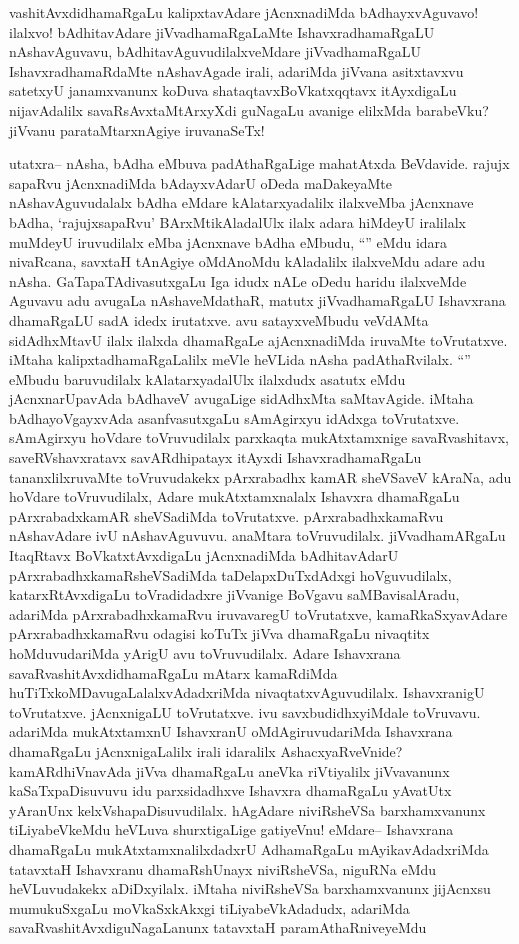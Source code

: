 
\begin{artha}
vashitAvxdidhamaRgaLu kalipxtavAdare jAcnxnadiMda bAdhayxvAguvavo! ilalxvo! bAdhitavAdare jiVvadhamaRgaLaMte IshavxradhamaRgaLU nAshavAguvavu, bAdhitavAguvudilalxveMdare jiVvadhamaRgaLU IshavxradhamaRdaMte nAshavAgade irali, adariMda jiVvana asitxtavxvu satetxyU janamxvanunx koDuva shataqtavxBoVkatxqqtavx itAyxdigaLu nijavAdalilx savaRsAvxtaMtArxyXdi guNagaLu avanige elilxMda barabeVku? jiVvanu parataMtarxnAgiye iruvanaSeTx!
\end{artha}

\begin{artha}
utatxra-- nAsha, bAdha eMbuva padAthaRgaLige mahatAtxda BeVdavide. rajujx sapaRvu jAcnxnadiMda bAdayxvAdarU oDeda maDakeyaMte nAshavAguvudalalx bAdha eMdare kAlatarxyadalilx ilalxveMba jAcnxnave bAdha, `rajujxsapaRvu' BArxMtikAladalUlx ilalx adara hiMdeyU iralilalx muMdeyU iruvudilalx eMba jAcnxnave bAdha eMbudu, ``\stext'' eMdu idara nivaRcana, savxtaH tAnAgiye oMdAnoMdu kAladalilx ilalxveMdu adare adu nAsha. GaTapaTAdivasutxgaLu Iga idudx nALe oDedu haridu ilalxveMde Aguvavu adu avugaLa nAshaveMdathaR, matutx jiVvadhamaRgaLU Ishavxrana dhamaRgaLU sadA idedx irutatxve. avu satayxveMbudu veVdAMta sidAdhxMtavU ilalx ilalxda dhamaRgaLe ajAcnxnadiMda iruvaMte toVrutatxve. iMtaha kalipxtadhamaRgaLalilx meVle heVLida nAsha padAthaRvilalx. ``\stext'' eMbudu baruvudilalx kAlatarxyadalUlx ilalxdudx asatutx eMdu jAcnxnarUpavAda bAdhaveV avugaLige sidAdhxMta saMtavAgide. iMtaha bAdhayoVgayxvAda asanfvasutxgaLu sAmAgirxyu idAdxga toVrutatxve. sAmAgirxyu hoVdare toVruvudilalx parxkaqta mukAtxtamxnige savaRvashitavx, saveRVshavxratavx savARdhipatayx itAyxdi IshavxradhamaRgaLu tananxlilxruvaMte toVruvudakekx pArxrabadhx kamAR sheVSaveV kAraNa, adu hoVdare toVruvudilalx, Adare mukAtxtamxnalalx Ishavxra dhamaRgaLu pArxrabadxkamAR sheVSadiMda toVrutatxve. pArxrabadhxkamaRvu nAshavAdare ivU nAshavAguvuvu. anaMtara toVruvudilalx. jiVvadhamARgaLu ItaqRtavx BoVkatxtAvxdigaLu jAcnxnadiMda bAdhitavAdarU pArxrabadhxkamaRsheVSadiMda taDelapxDuTxdAdxgi hoVguvudilalx, katarxRtAvxdigaLu toVradidadxre jiVvanige BoVgavu saMBavisalAradu, adariMda pArxrabadhxkamaRvu iruvavaregU toVrutatxve, kamaRkaSxyavAdare pArxrabadhxkamaRvu odagisi koTuTx jiVva dhamaRgaLu nivaqtitx hoMduvudariMda yArigU avu toVruvudilalx. Adare Ishavxrana savaRvashitAvxdidhamaRgaLu mAtarx kamaRdiMda huTiTxkoMDavugaLalalxvAdadxriMda nivaqtatxvAguvudilalx. IshavxranigU toVrutatxve. jAcnxnigaLU toVrutatxve. ivu savxbudidhxyiMdale toVruvavu. adariMda mukAtxtamxnU IshavxranU oMdAgiruvudariMda Ishavxrana dhamaRgaLu jAcnxnigaLalilx irali idaralilx AshacxyaRveVnide? kamARdhiVnavAda jiVva dhamaRgaLu aneVka riVtiyalilx jiVvavanunx kaSaTxpaDisuvuvu idu parxsidadhxve Ishavxra dhamaRgaLu yAvatUtx yAranUnx kelxVshapaDisuvudilalx. hAgAdare niviRsheVSa barxhamxvanunx tiLiyabeVkeMdu heVLuva shurxtigaLige gatiyeVnu! eMdare-- Ishavxrana dhamaRgaLu mukAtxtamxnalilxdadxrU AdhamaRgaLu mAyikavAdadxriMda tatavxtaH Ishavxranu dhamaRshUnayx niviRsheVSa, niguRNa eMdu heVLuvudakekx aDiDxyilalx. iMtaha niviRsheVSa barxhamxvanunx jijAcnxsu mumukuSxgaLu moVkaSxkAkxgi tiLiyabeVkAdadudx, adariMda savaRvashitAvxdiguNagaLanunx tatavxtaH paramAthaRniveyeMdu 
\end{artha}
